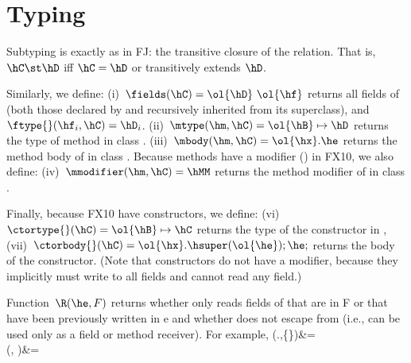 \documentclass[a4paper]{article}
\begin{document}
\section{Typing}
{Subtyping} is exactly as in FJ:
    the transitive closure of the \hextends relation.
That is, $\hC \st \hD$ iff $\hC=\hD$ or \hC transitively extends $\hD$.

Similarly, we define:
(i)~$\fields(\hC)=\ol{\hD}~\ol{\hf}$ returns all fields of \hC (both those declared by \hC and recursively inherited from its superclass),
    and~$\ftype{}(\hf_i,\hC) =\hD_i$.
(ii)~$\mtype(\hm,\hC) = \ol{\hB}\mapsto\hD$ returns the type of method \hm in class \hC.
(iii)~$\mbody(\hm,\hC) = \ol{\hx}.\he$ returns the method body of \hm in class \hC.
Because methods have a modifier (\hMM) in FX10, we also define:
(iv)~$\mmodifier(\hm,\hC) = \hMM$ returns the method modifier of \hm in class \hC.

Finally, because FX10 have constructors, we define:
(vi)~$\ctortype{}(\hC) = \ol{\hB}\mapsto\hC$ returns the type of the constructor in \hC,
(vii)~$\ctorbody{}(\hC) = \ol{\hx}.\hsuper(\ol{\he});\he;$ returns the body of the constructor.
(Note that constructors do not have a modifier, because they implicitly must write to all fields and cannot read any field.)


Function~$\R(\he,F)$ returns whether
    \he only reads fields of \this that are in F or that have been previously written in e
    and whether
    \this does not escape from \he (i.e., \this can be used only as a field or method receiver).
For example,
    \R(\this.\hf,\{\hf\})&=\htrue\\
    \R(, \emptyset)&=\htrue\\
\eeq
\end{document}
